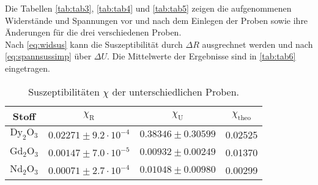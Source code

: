 Die Tabellen \autoref{tab:tab3}, \autoref{tab:tab4} und \autoref{tab:tab5} zeigen die aufgenommenen Widerstände und Spannungen vor und nach dem
Einlegen der Proben sowie ihre Änderungen für die drei verschiedenen Proben.\\
Nach \eqref{eq:widsus} kann die Suszeptibilität durch $ \Delta R $ ausgrechnet werden und nach \eqref{eq:spannsussimp} über $\Delta U$.
Die Mittelwerte der Ergebnisse sind in \autoref{tab:tab6} eingetragen.


\begin{table}[H]
    \centering
    \caption{Suszeptibilitäten $\chi$ der unterschiedlichen Proben.}
    \label{tab:tab6}
    \begin{tabular}{S S S S}
      \toprule
       {Stoff} & {$\chi_{\text{R}}$} & {$\chi_{\text{U}}$} &{$\chi_{\text{theo}}$}  \\
      \midrule
      {$\text{Dy}_2\text{O}_3$}  &{$0.02271 \pm 9.2 \cdot 10^{-4}$}    &{$ 0.38346 \pm 0.30599$} &{0.02525}         \\
      {$\text{Gd}_2\text{O}_3$}  &{$0.00147 \pm 7.0 \cdot 10^{-5}$}    &{$ 0.00932 \pm 0.00249$} &{0.01370}             \\
      {$\text{Nd}_2 \text{O}_3$} &{$0.00071 \pm 2.7 \cdot 10^{-4}$}    &{$ 0.01048 \pm 0.00980$} &{0.00299}         \\
      \bottomrule
    \end{tabular}
\end{table}
